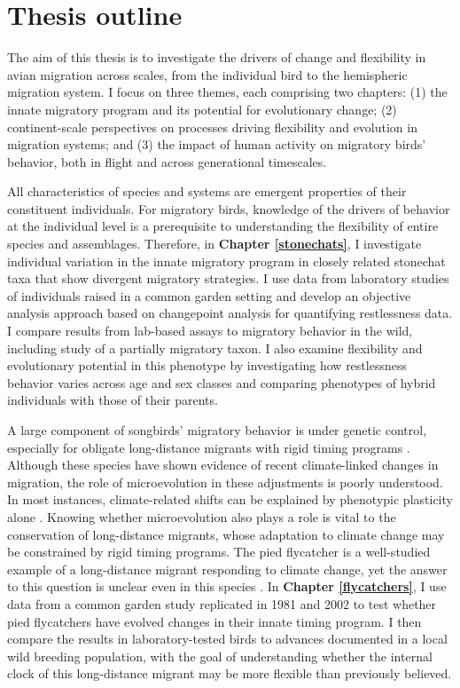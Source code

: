 \documentclass[a4paper, nobind]{templates/ociamthesis}
\begin{document}
\hypertarget{thesis-outline}{%
\section*{Thesis outline}\label{thesis-outline}}

The aim of this thesis is to investigate the drivers of change and flexibility in avian migration across scales, from the individual bird to the hemispheric migration system. I focus on three themes, each comprising two chapters: (1) the innate migratory program and its potential for evolutionary change; (2) continent-scale perspectives on processes driving flexibility and evolution in migration systems; and (3) the impact of human activity on migratory birds' behavior, both in flight and across generational timescales.

All characteristics of species and systems are emergent properties of their constituent individuals. For migratory birds, knowledge of the drivers of behavior at the individual level is a prerequisite to understanding the flexibility of entire species and assemblages. Therefore, in \textbf{Chapter \ref{stonechats}}, I investigate individual variation in the innate migratory program in closely related stonechat taxa that show divergent migratory strategies. I use data from laboratory studies of individuals raised in a common garden setting and develop an objective analysis approach based on changepoint analysis for quantifying restlessness data. I compare results from lab-based assays to migratory behavior in the wild, including study of a partially migratory taxon. I also examine flexibility and evolutionary potential in this phenotype by investigating how restlessness behavior varies across age and sex classes and comparing phenotypes of hybrid individuals with those of their parents.

A large component of songbirds' migratory behavior is under genetic control, especially for obligate long-distance migrants with rigid timing programs \autocite{liedvogelGeneticsMigration2014}. Although these species have shown evidence of recent climate-linked changes in migration, the role of microevolution in these adjustments is poorly understood. In most instances, climate-related shifts can be explained by phenotypic plasticity alone \autocite{charmantierClimateChangeTiming2014}. Knowing whether microevolution also plays a role is vital to the conservation of long-distance migrants, whose adaptation to climate change may be constrained by rigid timing programs. The pied flycatcher is a well-studied example of a long-distance migrant responding to climate change, yet the answer to this question is unclear even in this species \autocite{bothFlexibilityTimingAvian2010}. In \textbf{Chapter \ref{flycatchers}}, I use data from a common garden study replicated in 1981 and 2002 to test whether pied flycatchers have evolved changes in their innate timing program. I then compare the results in laboratory-tested birds to advances documented in a local wild breeding population, with the goal of understanding whether the internal clock of this long-distance migrant may be more flexible than previously believed.
\end{document}
